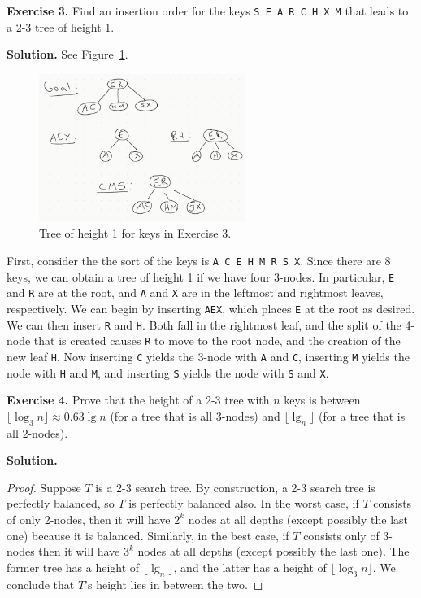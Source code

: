 \documentclass[12pt, a4paper]{article}
\newenvironment{ex}[2][Exercise]
{\par\medskip\noindent \textbf{#1 #2.}}
{\medskip}
\newenvironment{sol}[1][Solution]
{\par\medskip\noindent \textbf{#1.} }
{\medskip}
\begin{document}
	\begin{ex}{3}
		Find an insertion order for the keys \texttt{S E A R C H X M} that leads to a
		2-3 tree of height 1.
	\end{ex}
	\begin{sol}
		See Figure~\ref{fig:ex-03}.
		
		\begin{figure}
			\centering
			\includegraphics[width=0.6\textwidth]{exercise-03}
			\caption{Tree of height 1 for keys in Exercise 3.}
			\label{fig:ex-03}
		\end{figure}
		
		First, consider the the sort of the keys is \texttt{A C E H M R S X}.
		Since there are 8 keys, we can obtain a tree of height 1 if we have four 3-nodes.
		In particular, \texttt{E} and \texttt{R} are at the root, and \texttt{A} and \texttt{X}
		are in the leftmost and rightmost leaves, respectively. We can begin by inserting
		\texttt{AEX}, which places \texttt{E} at the root as desired. We can then insert
		\texttt{R} and \texttt{H}. Both fall in the rightmost leaf, and the split of the
		4-node that is created causes \texttt{R} to move to the root node, and the
		creation of the new leaf \texttt{H}. Now inserting \texttt{C} yields the 3-node
		with \texttt{A} and \texttt{C}, inserting \texttt{M} yields the node with \texttt{H} and
		\texttt{M}, and inserting \texttt{S} yields the node with \texttt{S} and \texttt{X}.
	\end{sol}
	\begin{ex}{4}
		Prove that the height of a 2-3 tree with $n$ keys is between $\lfloor \log_3n\rfloor
		\approx 0.63\lg n$ (for a tree that is all 3-nodes) and $\lfloor \lg_n\rfloor$
		(for a tree that is all $2$-nodes).
	\end{ex}
	\begin{sol}
		\begin{proof}
			Suppose $T$ is a 2-3 search tree. By construction, a 2-3 search tree is
			perfectly balanced, so $T$ is perfectly balanced also. In the worst case, if
			$T$ consists of only 2-nodes, then it will have $2^k$ nodes at all depths
			(except possibly the last one) because it is balanced. Similarly, in the best
			case, if $T$ consists only of 3-nodes then it will have $3^k$ nodes at all
			depths (except possibly the last one). The former tree has a height of
			$\lfloor \lg_n\rfloor$, and the latter has a height of $\lfloor \log_3 n\rfloor$.
			We conclude that $T$'s height lies in between the two.
		\end{proof}
	\end{sol}
\end{document}
